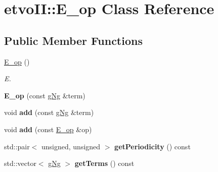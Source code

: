 \hypertarget{classetvo_i_i_1_1_e__op}{}\section{etvo\+II\+:\+:E\+\_\+op Class Reference}
\label{classetvo_i_i_1_1_e__op}
\subsection*{Public Member Functions}
\begin{DoxyCompactItemize}
\item 
\mbox{\label{classetvo_i_i_1_1_e__op_a1b3616b3a5abca1b395075c1e302e2b5}} 
\mbox{\hyperlink{classetvo_i_i_1_1_e__op_a1b3616b3a5abca1b395075c1e302e2b5}{E\+\_\+op}} ()
\begin{DoxyCompactList}\small\item\em E. \end{DoxyCompactList}\item 
\mbox{\label{classetvo_i_i_1_1_e__op_a3fccb628ca2e37bff300f4751517acb2}} 
{\bfseries E\+\_\+op} (const \mbox{\hyperlink{classetvo_i_i_1_1g_ng}{g\+Ng}} \&term)
\item 
\mbox{\label{classetvo_i_i_1_1_e__op_aeae079ab28d9e1e3b2b51fb321f1531f}} 
void {\bfseries add} (const \mbox{\hyperlink{classetvo_i_i_1_1g_ng}{g\+Ng}} \&term)
\item 
\mbox{\label{classetvo_i_i_1_1_e__op_ab7cd99ab85303c646657bc9d7d5f966b}} 
void {\bfseries add} (const \mbox{\hyperlink{classetvo_i_i_1_1_e__op}{E\+\_\+op}} \&op)
\item 
\mbox{\label{classetvo_i_i_1_1_e__op_a23bf72df8da0c91af8c97610cd488efa}} 
std\+::pair$<$ unsigned, unsigned $>$ {\bfseries get\+Periodicity} () const
\item 
\mbox{\label{classetvo_i_i_1_1_e__op_ab7a25edc78644c97479335c7ca865bb0}} 
std\+::vector$<$ \mbox{\hyperlink{classetvo_i_i_1_1g_ng}{g\+Ng}} $>$ {\bfseries get\+Terms} () const
\item 
\mbox{\label{classetvo_i_i_1_1_e__op_adf9dc48bdefbdcdfec44607da02cbb40}} 

\end{DoxyCompactItemize}
